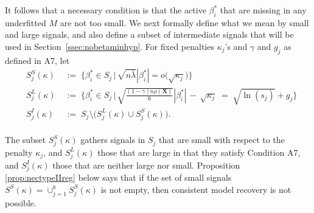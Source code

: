 \documentclass[aos]{imsart}
\theoremstyle{plain}
\newcommand{\david}[1]{{\small{\color{blue} \sf $\heartsuit$ David: #1}}}
\newcommand{\bs}{\boldsymbol}
\begin{document}
It follows that a necessary condition is that the active $\beta_i^*$ that are missing in any underfitted $M$ are not too small. We next formally define what we mean by small and large signals, and also define a subset of intermediate signals 
that will be used in Section~\ref{ssec:nobetaminhyp}.  For fixed penalties $\kappa_j$'s and %
$\gamma$ and $g_j$ as defined in A7, let
\begin{eqnarray}
    &S_j^{S}(\kappa)\;&:=\;\Bigg\{\beta_i^* \in S_j \,\Big|\,\sqrt{n\bar{\lambda}}|\beta_{i}^*|=o\big(\sqrt{\kappa_j}\big) \Bigg\}\nonumber\\
    &S_j^{L}(\kappa)\;&:=\;\Bigg\{\beta_i^* \in S_j \,\Big|\,\sqrt{\frac{(1-\gamma) n\rho(\bs X)}{6}}|\beta_{i}^*| \,- \,\sqrt{\kappa_j} \;=\; \sqrt{\ln(s_j)} + g_j\Bigg\}\label{eq:defslsi}\\
    &S_j^{I}(\kappa)\;&:=\;S_j \setminus \big(S_j^{L}(\kappa) \cup S_j^{S}(\kappa)\big).
    \nonumber 
\end{eqnarray} \\
The subset $S_j^{S}(\kappa)$ gathers signals in $S_j$ that are small with respect to the penalty $\kappa_j$, and $S_j^{L}(\kappa)$ those that are large in that they satisfy Condition A7, and $S_j^{I}(\kappa)$ those that are neither large nor small. 
Proposition \ref{prop:nectypeIIreg} below says that if the set of small signals $S^{S}(\kappa)=\cup_{j=1}^b S_j^{S}(\kappa)$ is not empty, then consistent model recovery is not possible. \color{black}
\end{document}
